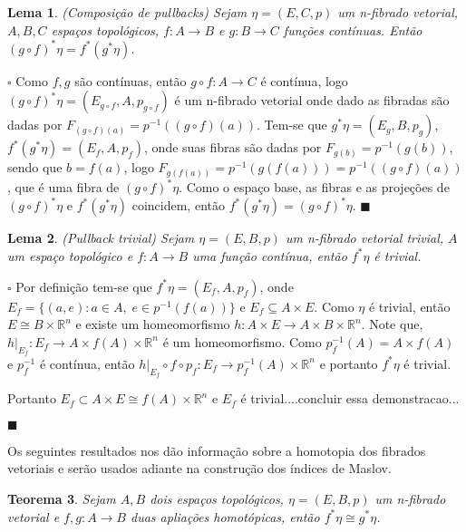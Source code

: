\documentclass[12pt]{book}
\newtheorem{teorema}{Teorema}[section]
\newtheorem{lema}[teorema]{Lema}
\newenvironment{prova}[1]{$\square$ #1}{\hfill$\blacksquare$}
\newcommand{\real}[1]{\mathbb{R}^{#1}}
\newcommand{\vermelho}[1]{{\color{red}#1}}
\begin{document}
	\begin{lema}\label{pullback_composicao}
		(Composição de pullbacks) Sejam $\eta =(E, C, p)$ um n-fibrado vetorial, $A, B, C$ espaços topológicos, $f:A\to B$ e $g:B\to C$ funções contínuas. Então $(g\circ f)^{*} \eta= f^{*}(g^{*}\eta)$.
	\end{lema}
	\begin{prova}
		Como $f, g$ são contínuas, então $g\circ f:A\to C$ é contínua, logo $(g\circ f)^{*}\eta = (E_{g\circ f}, A, p_{g\circ f})$ é um n-fibrado vetorial onde dado as fibradas são dadas por $F_{(g\circ f)(a)} = p^{-1}((g\circ f)(a))$. Tem-se que $g^{*}\eta=(E_{g}, B, p_{g})$, $f^{*}(g^{*}\eta) = (E_{f}, A, p_{f})$, onde suas fibras são dadas por $F_{g(b)} = p^{-1}(g(b))$, sendo que $b=f(a)$, logo  $F_{g(f(a))} = p^{-1}(g(f(a))) = p^{-1}((g \circ f)(a))$, que é uma fibra de $(g\circ f)^{*}\eta$. Como o espaço base, as fibras e as projeções de $(g\circ f)^{*}\eta$ e $f^{*}(g^{*}\eta)$ coincidem, então $f^{*}(g^{*}\eta) = (g\circ f)^{*}\eta$.
	\end{prova}
	\begin{lema}\label{pullback_trivial}
		(Pullback trivial) Sejam $\eta = (E, B, p)$ um n-fibrado vetorial trivial, $A$ um espaço topológico e $f:A\to B$ uma função contínua, então $f^{*}\eta$ é trivial.
	\end{lema}
	\begin{prova}
		Por definição tem-se que $f^{*}\eta = (E_{f}, A, p_{f})$, onde $E_{f}=\{(a, e): a\in A,\; e \in p^{-1}(f(a)) \}$ e $E_{f} \subseteq A\times E$. Como $\eta$ é trivial, então $E \cong B\times \real{n}$ e existe um homeomorfismo $h: A\times E \to A\times B\times \real{n}$. Note que, $h|_{E_{f}}: E_{f}\to A\times f(A)\times \real{n} $ é um homeomorfismo. Como $p_{f}^{-1}(A) = A\times f(A)$ e $p^{-1}_{f}$ é contínua, então $h|_{E_{f}}\circ f\circ p_{f}: E_{f}\to p_{f}^{-1}(A)\times \real{n} $ e portanto $f^{*}\eta$ é trivial.
		\vermelho{
			
			Portanto $E_{f} \subset A\times E \cong f(A)\times \real{n}$ e $E_{f}$ é trivial....concluir essa demonstracao...}
	\end{prova}
	
	Os seguintes resultados nos dão informação sobre a homotopia dos fibrados vetoriais e serão usados adiante na construção dos índices de Maslov.
	
	\begin{teorema}\label{pullback_isomorfismo}
		Sejam $A, B$ dois espaços topológicos, $\eta=(E, B, p)$ um n-fibrado vetorial e $f,g: A\to B$ duas apliações homotópicas, então $f^{*}\eta \cong g^{*}\eta$.
	\end{teorema}
	
\end{document}

